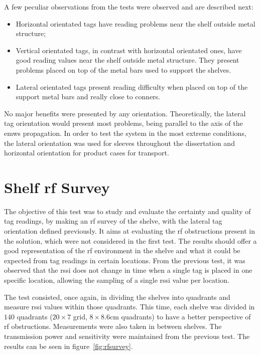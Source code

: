 A few peculiar observations from the tests were observed and are described next:

\begin{itemize}
    \item Horizontal orientated tags have reading problems near the shelf outside metal structure;
    \item Vertical orientated tags, in contrast with horizontal orientated ones, have good reading values near the shelf outside metal structure. They present problems placed on top of the metal bars used to support the shelves.
    \item Lateral orientated tags present reading difficulty when placed on top of the support metal bars and really close to conners.
\end{itemize}

No major benefits were presented by any orientation.
Theoretically, the lateral tag orientation would present most problems, being parallel to the axis of the \acp{emw} propagation.
In order to test the system in the most extreme conditions, the lateral orientation was used for sleeves throughout the dissertation and horizontal orientation for product cases for transport.

\section{Shelf \acs{rf} Survey}

The objective of this test was to study and evaluate the certainty and quality of tag readings, by making an \ac{rf} survey of the shelve, with the lateral tag orientation defined previously.
It aims at evaluating the \ac{rf} obstructions present in the solution, which were not considered in the first test.
The results should offer a good representation of the \ac{rf} environment in the shelve and what it could be expected from tag readings in certain locations. 
From the previous test, it was observed that the \ac{rssi} does not change in time when a single tag is placed in one specific location, allowing the sampling of a single \ac{rssi} value per location. 

The test consisted, once again, in dividing the shelves into quadrants and measure \ac{rssi} values within those quadrants. This time, each shelve was divided in $140$ quadrants ($20\times7$ grid, $8\times8.6$cm quadrants) to have a better perspective of \ac{rf} obstructions. Measurements were also taken in between shelves. The transmission power and sensitivity were maintained from the previous test.
The results can be seen in figure~\ref{fig:rfsurvey}.

